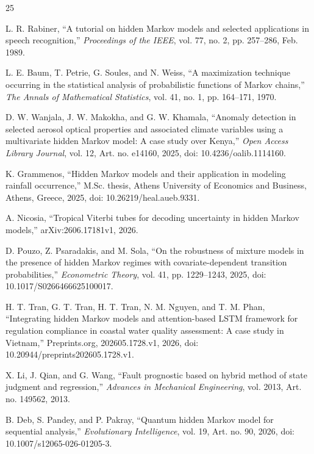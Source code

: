 \documentclass[11pt,letterpaper]{article}
\begin{document}
\begin{thebibliography}{25}

L. R. Rabiner, ``A tutorial on hidden Markov models and selected applications in speech recognition,'' \emph{Proceedings of the IEEE}, vol. 77, no. 2, pp. 257--286, Feb. 1989.

L. E. Baum, T. Petrie, G. Soules, and N. Weiss, ``A maximization technique occurring in the statistical analysis of probabilistic functions of Markov chains,'' \emph{The Annals of Mathematical Statistics}, vol. 41, no. 1, pp. 164--171, 1970.

D. W. Wanjala, J. W. Makokha, and G. W. Khamala, ``Anomaly detection in selected aerosol optical properties and associated climate variables using a multivariate hidden Markov model: A case study over Kenya,'' \emph{Open Access Library Journal}, vol. 12, Art. no. e14160, 2025, doi: 10.4236/oalib.1114160.

K. Grammenos, ``Hidden Markov models and their application in modeling rainfall occurrence,'' M.Sc. thesis, Athens University of Economics and Business, Athens, Greece, 2025, doi: 10.26219/heal.aueb.9331.

A. Nicosia, ``Tropical Viterbi tubes for decoding uncertainty in hidden Markov models,'' arXiv:2606.17181v1, 2026.

D. Pouzo, Z. Psaradakis, and M. Sola, ``On the robustness of mixture models in the presence of hidden Markov regimes with covariate-dependent transition probabilities,'' \emph{Econometric Theory}, vol. 41, pp. 1229--1243, 2025, doi: 10.1017/S0266466625100017.

H. T. Tran, G. T. Tran, H. T. Tran, N. M. Nguyen, and T. M. Phan, ``Integrating hidden Markov models and attention-based LSTM framework for regulation compliance in coastal water quality assessment: A case study in Vietnam,'' Preprints.org, 202605.1728.v1, 2026, doi: 10.20944/preprints202605.1728.v1.

X. Li, J. Qian, and G. Wang, ``Fault prognostic based on hybrid method of state judgment and regression,'' \emph{Advances in Mechanical Engineering}, vol. 2013, Art. no. 149562, 2013.

B. Deb, S. Pandey, and P. Pakray, ``Quantum hidden Markov model for sequential analysis,'' \emph{Evolutionary Intelligence}, vol. 19, Art. no. 90, 2026, doi: 10.1007/s12065-026-01205-3.


\end{thebibliography}
\end{document}
